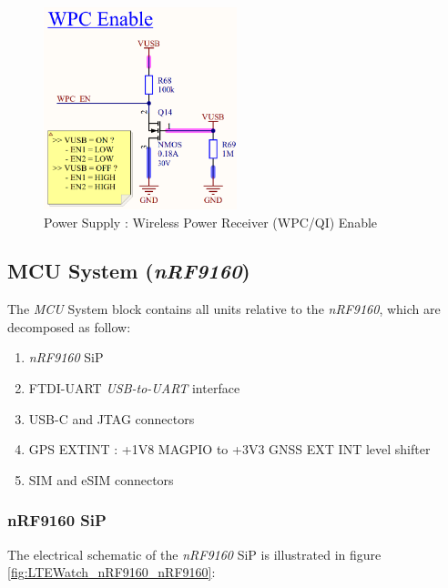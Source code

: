 \documentclass[report.tex]{subfiles}
\begin{document}
\begin{figure}[H]
	\centering
	\includegraphics[width=0.5\textwidth]{Include/Figure/Hardware/LTEWatch_WPC_RCVR_WPC_Enable}
	\caption{Power Supply : Wireless Power Receiver (WPC/QI) Enable}
	\label{fig:LTEWatch_WPC_RCVR_WPC_Enable}
\end{figure}


\subsection{MCU System (\textit{nRF9160})}

The \textit{MCU} System block contains all units relative to the \textit{nRF9160}, which are decomposed as follow:
\begin{enumerate}
\item \textit{nRF9160} SiP
\item FTDI-UART \textit{USB-to-UART} interface
\item USB-C and JTAG connectors
\item GPS EXTINT : +1V8 MAGPIO to +3V3 GNSS EXT INT level shifter
\item SIM and eSIM connectors
\end{enumerate}

\pagebreak

\subsubsection{nRF9160 SiP}

The electrical schematic of the \textit{nRF9160} SiP is illustrated in figure \ref{fig:LTEWatch_nRF9160_nRF9160}:
\end{document}
